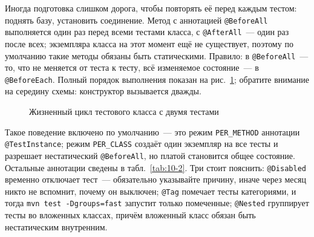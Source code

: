 Иногда подготовка слишком дорога, чтобы повторять её перед каждым тестом: поднять базу, установить соединение. Метод с аннотацией \texttt{@BeforeAll} выполняется один раз перед всеми тестами класса, с \texttt{@AfterAll}~--- один раз после всех; экземпляра класса на этот момент ещё не существует, поэтому по умолчанию такие методы обязаны быть статическими. Правило: в \texttt{@BeforeAll}~--- то, что не меняется от теста к тесту, всё изменяемое состояние~--- в \texttt{@BeforeEach}. Полный порядок выполнения показан на рис.~\ref{fig:10-3}; обратите внимание на середину схемы: конструктор вызывается дважды.

\begin{figure}[htbp]\centering
{}
\caption{Жизненный цикл тестового класса с двумя тестами}\label{fig:10-3}
\end{figure}

Такое поведение включено по умолчанию~--- это режим \texttt{PER\_METHOD} аннотации \texttt{@TestInstance}; режим \texttt{PER\_CLASS} создаёт один экземпляр на все тесты и разрешает нестатический \texttt{@BeforeAll}, но платой становится общее состояние. Остальные аннотации сведены в табл.~\ref{tab:10-2}. Три стоит пояснить: \texttt{@Disabled} временно отключает тест~--- обязательно указывайте причину, иначе через месяц никто не вспомнит, почему он выключен; \texttt{@Tag} помечает тесты категориями, и тогда \texttt{mvn test -Dgroups=fast} запустит только помеченные; \texttt{@Nested} группирует тесты во вложенных классах, причём вложенный класс обязан быть нестатическим внутренним.

